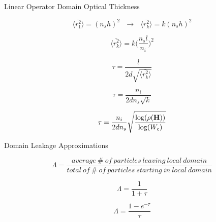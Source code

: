 \documentclass{beamer}
\begin{document}
\begin{frame}{Linear Operator Domain Optical Thickness}

  \begin{equation}
    \langle \bar{r_1^2} \rangle = (n_s h)^2 \ \ \ \rightarrow
    \ \ \ \langle \bar{r_k^2} \rangle = k (n_s h)^2
    \label{eq:step_1_length}
  \end{equation}

  \begin{equation}
    \langle \bar{r_k^2} \rangle = k \Bigg(\frac{n_s l}{n_i}\Bigg)^2
    \label{eq:step_k_length_sub}
  \end{equation}

  \begin{equation}
    \tau = \frac{l}{2 d \sqrt{\langle \bar{r_k^2} \rangle}}
      \label{eq:optical_thickness_1}
  \end{equation}

  \begin{equation}
    \tau = \frac{n_i}{2 d n_s \sqrt{k}}
    \label{eq:optical_thickness_2}
  \end{equation}

  \begin{equation}
    \tau = \frac{n_i}{2 d n_s}
    \sqrt{\frac{\log(\rho(\mathbf{H}))}{\log(W_c)}}
    \label{eq:optical_thickness_3}
  \end{equation}

\end{frame}

\begin{frame}{Domain Leakage Approximations}

  \begin{equation}
    \Lambda = \frac{average\ \#\ of\ particles\ leaving\ local\ domain}
            {total\ of\ \#\ of\ particles\ starting\ in\ local\ domain}
            \label{eq:leakage_fraction}
  \end{equation}

  \begin{equation}
    \Lambda = \frac{1}{1+\tau}
    \label{eq:wigner_domain_leakage}
  \end{equation}

  \begin{equation}
    \Lambda = \frac{1-e^{-\tau}}{\tau}
    \label{eq:mean_chord_domain_leakage}
  \end{equation}

\end{frame}
\end{document}
